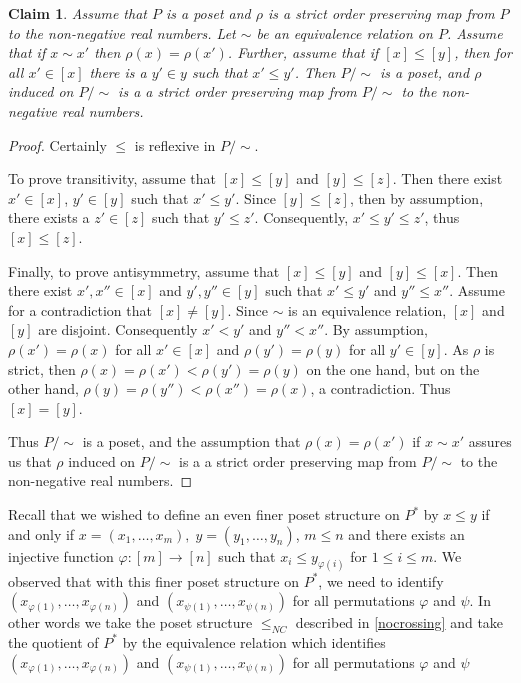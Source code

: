 \documentclass[acmsmall,review,anonymous]{acmart}\settopmatter{printfolios=true,printccs=false,printacmref=false}
\newtheorem{claim}{Claim}
\begin{document}
\begin{claim}\label{quotientposet}
Assume that $P$ is a poset and $\rho$ is a strict order preserving map from $P$
to the non-negative real numbers. Let $\sim$ be an equivalence relation on $P$.
Assume that if $x \sim x'$ then $\rho(x) = \rho(x')$. Further, assume that if
$[x] \leq [y]$, then for all $x' \in [x]$ there is a $y' \in y$ such that $x'
\leq y'$. Then $P/{\sim}$ is a poset, and $\rho$ induced on $P/{\sim}$ is a
a strict order preserving map from $P/{\sim}$ to the non-negative real numbers.
\end{claim}
\begin{proof}
Certainly $\leq$ is reflexive in $P/{\sim}$.

To prove transitivity, assume that $[x] \leq [y]$ and $[y] \leq [z]$. Then
there exist $x' \in [x]$, $y' \in [y]$ such that $x' \leq y'$. Since $[y] \leq
[z]$, then by assumption, there exists a $z' \in [z]$ such that $y' \leq z'$.
Consequently, $x' \leq y' \leq z'$, thus $[x] \leq [z]$.

Finally, to prove antisymmetry, assume that $[x] \leq [y]$ and $[y] \leq [x]$.
Then there exist $x', x'' \in [x]$ and $y', y'' \in [y]$ such that $x' \leq y'$
and $y'' \leq x''$. Assume for a contradiction that $[x] \neq [y]$. Since $\sim$
is an equivalence relation, $[x]$ and $[y]$ are disjoint. Consequently $x' <
y'$ and $y'' < x''$. By assumption, $\rho(x') = \rho(x)$ for all $x' \in [x]$
and $\rho(y') = \rho(y)$ for all $y' \in [y]$. As $\rho$ is strict, then
$\rho(x) = \rho(x') < \rho(y') = \rho(y)$ on the one hand, but on the other
hand, $\rho(y) = \rho(y'') < \rho(x'') = \rho(x)$, a contradiction. Thus $[x] =
[y]$.

Thus $P/{\sim}$ is a poset, and the assumption that $\rho(x) = \rho(x')$
if $x \sim x'$ assures us that $\rho$ induced on $P/{\sim}$ is a
a strict order preserving map from $P/{\sim}$ to the non-negative real numbers.
\end{proof}

Recall that we wished to define an even finer poset structure on $P^*$ by $x
\leq y$ if and only if $x = (x_1, \ldots, x_m), \; y = (y_1, \ldots, y_n)$, $m
\leq n$ and there exists an injective function $\varphi : [m] \longrightarrow
[n]$ such that $x_i \leq y_{\varphi(i)}$ for $1 \leq i \leq m$. We observed
that with this finer poset structure on $P^*$, we need to identify
$(x_{\varphi(1)}, \ldots, x_{\varphi(n)})$ and $(x_{\psi(1)}, \ldots,
x_{\psi(n)})$ for all permutations $\varphi$ and $\psi$. In other words we take
the poset structure $\leq_{NC}$ described in \cref{nocrossing} and take
the quotient of $P^*$ by the equivalence relation which identifies
$(x_{\varphi(1)}, \ldots, x_{\varphi(n)})$ and $(x_{\psi(1)}, \ldots,
x_{\psi(n)})$ for all permutations $\varphi$ and $\psi$
\end{document}
